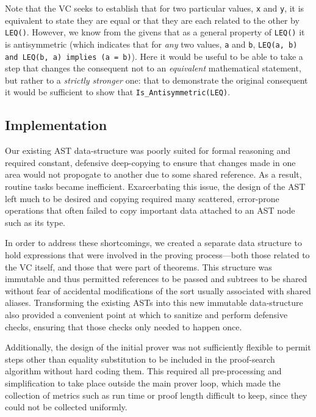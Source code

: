 Note that the VC seeks to establish that for two particular values, \texttt{x} and \texttt{y}, it is equivalent to state they are equal or that they are each related to the other by \texttt{LEQ()}.  However, we know from the givens that as a general property of \texttt{LEQ()} it is antisymmetric (which indicates that for \emph{any} two values, \texttt{a} and \texttt{b}, \texttt{LEQ(a,~b) and LEQ(b,~a) implies (a~=~b)}).  Here it would be useful to be able to take a step that changes the consequent not to an \emph{equivalent} mathematical statement, but rather to a \emph{strictly stronger} one: that to demonstrate the original consequent it would be sufficient to show that \texttt{Is\_Antisymmetric(LEQ)}.

	\subsection{Implementation}	
Our existing AST data-structure was poorly suited for formal reasoning and required constant, defensive deep-copying to ensure that changes made in one area would not propogate to another due to some shared reference.  As a result, routine tasks became inefficient.  Exarcerbating this issue, the design of the AST left much to be desired and copying required many scattered, error-prone operations that often failed to copy important data attached to an AST node such as its type.

In order to address these shortcomings, we created a separate data structure to hold expressions that were involved in the proving process---both those related to the VC itself, and those that were part of theorems.  This structure was immutable and thus permitted references to be passed and subtrees to be shared without fear of accidental modifications of the sort usually associated with shared aliases.  Transforming the existing ASTs into this new immutable data-structure also provided a convenient point at which to sanitize and perform defensive checks, ensuring that those checks only needed to happen once.

Additionally, the design of the initial prover was not sufficiently flexible to permit steps other than equality substitution to be included in the proof-search algorithm without hard coding them.  This required all pre-processing and simplification to take place outside the main prover loop, which made the collection of metrics such as run time or proof length difficult to keep, since they could not be collected uniformly.

